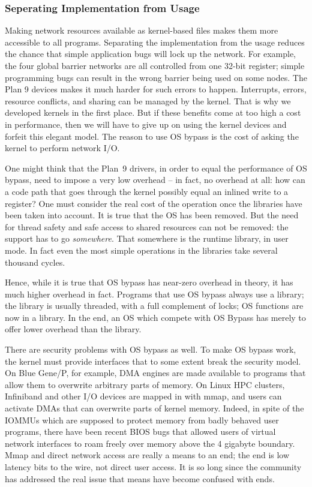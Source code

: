 \documentclass[a4,10pt,preprint]{sigplanconf}
\begin{document}
\subsubsection{Seperating Implementation from Usage}
Making network resources available as kernel-based files
makes them more accessible to all programs. Separating the 
implementation from the usage  reduces the chance that simple application bugs will lock up the network. 
For example, the four global barrier networks are all controlled from one 32-bit register; simple programming bugs can result in the wrong barrier 
being used on some nodes. The Plan 9 devices makes it much harder for such errors to happen. 
Interrupts, errors, resource conflicts, and sharing can be managed by the kernel. That is why we developed kernels in the first place. 
But if these benefits come at too high a cost in performance, then we will have to give up 
on using the kernel devices and forfeit this elegant model. The reason to use OS bypass is the cost of asking the kernel to 
perform network I/O. 

One might think that the Plan~9 drivers, in order to equal the performance of OS bypass, need to impose a very 
low overhead -- in fact, no overhead at all: how can a code path that goes through the kernel possibly equal an
inlined write to a register? One must consider the real cost of the operation once the libraries have been taken into account.
It is true that the OS has been removed. But the need for thread safety and safe access to shared resources can not be removed: the support  has to go {\em somewhere}. That somewhere is the runtime library, in user mode. In fact even the most simple operations in the libraries take several thousand cycles. 

Hence, while it is true that OS bypass has near-zero overhead in theory, it has much higher overhead in fact. 
Programs that use OS bypass always use a library; the library is usually threaded, with a full complement of locks; 
OS functions are now in a library. In the end, an OS which compete with OS Bypass  has merely to offer lower overhead than the library. 

There are security problems with OS bypass as well. 
To make OS bypass work, the kernel must provide interfaces that to some extent break the security model. On Blue Gene/P, for 
example, DMA engines  are made available to programs  that allow them to overwrite arbitrary parts of memory. On Linux HPC clusters, 
Infiniband and other I/O devices are mapped in with mmap, and users can activate DMAs that can overwrite parts of kernel memory. Indeed, 
in spite of the IOMMUs which are supposed to protect memory from badly behaved user programs, 
there have been recent BIOS bugs that allowed users of virtual network interfaces to roam freely over memory above the 4 gigabyte
boundary\cite{iommubug}. Mmap and direct network access are  really  a 
means to an end; the end is low latency bits to the wire, not direct user access. It is so long 
since the community has addressed the real issue that means have become confused with ends. 
\end{document}
